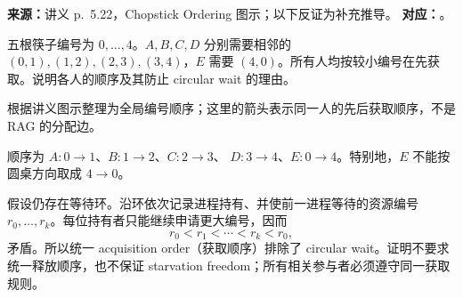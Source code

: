 
\textbf{来源：}讲义 p.~5.22，Chopstick Ordering 图示；以下反证为补充推导。\quad
\textbf{对应：}。

五根筷子编号为 $0,\ldots,4$。$A,B,C,D$ 分别需要相邻的
$(0,1),(1,2),(2,3),(3,4)$，$E$ 需要 $(4,0)$。所有人均按较小编号在先获取。说明各人的顺序及其防止 circular wait 的理由。

\begin{center}
  \resizebox{0.87\textwidth}{!}{}
  \par\small 根据讲义图示整理为全局编号顺序；这里的箭头表示同一人的先后获取顺序，不是 RAG 的分配边。
\end{center}

\begin{checkedsolution}
顺序为 $A:0\rightarrow1$、$B:1\rightarrow2$、$C:2\rightarrow3$、
$D:3\rightarrow4$、$E:0\rightarrow4$。特别地，$E$ 不能按圆桌方向取成 $4\rightarrow0$。

假设仍存在等待环。沿环依次记录进程持有、并使前一进程等待的资源编号 $r_0,\ldots,r_k$。每位持有者只能继续申请更大编号，因而
\[
  r_0<r_1<\cdots<r_k<r_0,
\]
矛盾。所以统一 acquisition order（获取顺序）排除了 circular wait。证明不要求统一释放顺序，也不保证 starvation freedom；所有相关参与者必须遵守同一获取规则。
\end{checkedsolution}
